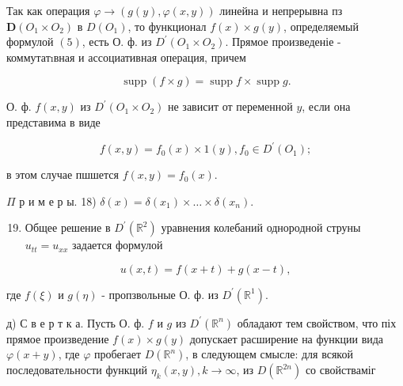 \documentclass[10pt]{article}
\begin{document}
Так как операция $\varphi \rightarrow(g(y), \varphi(x, y))$ линейна и непрерывна пз $\boldsymbol{D}\left(O_{1} \times O_{2}\right)$ в $D\left(O_{1}\right)$, то функционал $f(x) \times g(y)$, определяемый формулой $(5)$, есть О. ф. из $D^{\prime}\left(O_{1} \times O_{2}\right)$. Прямое произведеніе - коммутатıвная и ассоциативная операция, причем



\[

\operatorname{supp}(f \times g)=\operatorname{supp} f \times \operatorname{supp} g .

\]



О. ф. $f(x, y)$ из $D^{\prime}\left(O_{1} \times O_{2}\right)$ не зависит от переменной $y$, если она представима в виде



\[

f(x, y)=f_{0}(x) \times 1(y), f_{0} \in D^{\prime}\left(O_{1}\right) ;

\]



в этом случае пшшется $f(x, y)=f_{0}(x)$.



$\Pi$ р и м е р ы. 18) $\delta(x)=\delta\left(x_{1}\right) \times \ldots \times \delta\left(x_{n}\right)$.



\begin{enumerate}

  \setcounter{enumi}{18}

  \item Общее решение в $D^{\prime}\left(\mathbb{R}^{2}\right)$ уравнения колебаний однородной струны $u_{t t}=u_{x x}$ задается формулой

\end{enumerate}



\[

u(x, t)=f(x+t)+g(x-t),

\]



где $f(\xi)$ и $g(\eta)$ - пропзвольные О. ф. из $D^{\prime}\left(\mathbb{R}^{1}\right)$.



д) С в е р т к а. Пусть О. ф. $f$ и $g$ из $D^{\prime}\left(\mathbb{R}^{n}\right)$ обладают тем свойством, что піх прямое произведение $f(x) \times g(y)$ допускает расширение на функции вида $\varphi(x+y)$, где $\varphi$ пробегает $D\left(\mathbb{R}^{n}\right)$, в следующем смысле: для всякой последовательности функций $\eta_{k}(x, y), k \rightarrow \infty$, из $D\left(\mathbb{R}^{2 n}\right)$ со свойстваміг
\end{document}
